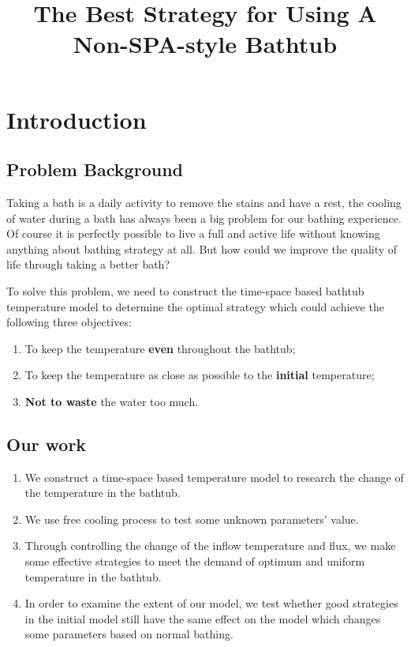 \documentclass[12pt]{article}
\title{The Best Strategy for Using A Non-SPA-style Bathtub}  %
\begin{document}

\section{Introduction}
\subsection{Problem Background}
Taking a bath is a daily activity to remove the stains and have a rest, the cooling of water during 
a bath has always been a big problem for our bathing experience. Of course it is perfectly possible
to live a full and active life without knowing anything about bathing strategy at all. But how could
we improve the quality of life through taking a better bath?

To solve this problem,  we need to construct the time-space based bathtub temperature model to
determine the optimal strategy which could achieve the following three objectives:
\begin{enumerate}[\quad\bf1.]
    \item To keep the temperature \textbf{even} throughout the bathtub;
    \item To keep the temperature as close as possible to the \textbf{initial} temperature;
    \item \textbf{Not to waste} the water too much.
\end{enumerate}

\subsection{Our work}
\begin{enumerate}[\bf 1.]
    \item We construct a time-space based temperature model to research the change of the
    temperature in the bathtub.
    \item We use free cooling process to test some unknown parameters' value.
    \item Through controlling the change of the inflow temperature and flux, we make some effective
    strategies to meet the demand of optimum and uniform temperature in the bathtub.
    \item In order to examine the extent of our model, we test whether good strategies in the
    initial model still have the same effect on the model which changes some parameters based on
    normal bathing.
\end{enumerate}
\end{document}
